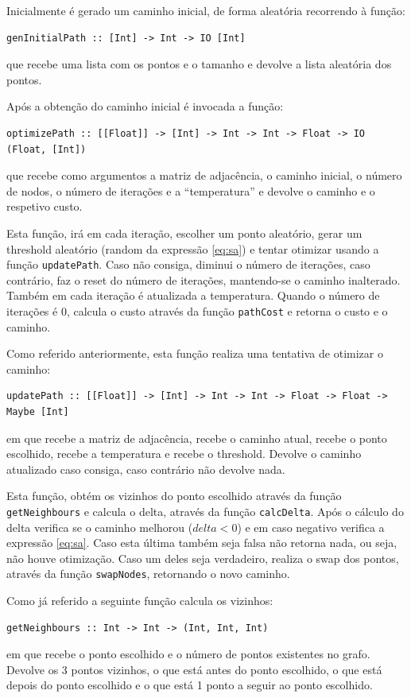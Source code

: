 \documentclass{article}
\begin{document}
Inicialmente é gerado um caminho inicial, de forma aleatória recorrendo à função:
\begin{verbatim}
genInitialPath :: [Int] -> Int -> IO [Int]
\end{verbatim}
que recebe uma lista com os pontos e o tamanho e devolve a lista aleatória dos pontos.

Após a obtenção do caminho inicial é invocada a função:
\begin{verbatim}
optimizePath :: [[Float]] -> [Int] -> Int -> Int -> Float -> IO (Float, [Int])
\end{verbatim}
que recebe como argumentos a matriz de adjacência, o caminho inicial, o número de nodos, o número de iterações e a ``temperatura'' e devolve o caminho e o respetivo custo. 

Esta função, irá em cada iteração, escolher um ponto aleatório, gerar um threshold aleatório (random da expressão \ref{eq:sa}) e tentar otimizar usando a função \texttt{updatePath}. Caso não consiga, diminui o número de iterações, caso contrário, faz o reset do número de iterações, mantendo-se o caminho inalterado. Também em cada iteração é atualizada a temperatura. Quando o número de iterações é 0, calcula o custo através da função \texttt{pathCost} e retorna o custo e o caminho.

Como referido anteriormente, esta função realiza uma tentativa de otimizar o caminho:
\begin{verbatim}
updatePath :: [[Float]] -> [Int] -> Int -> Int -> Float -> Float -> Maybe [Int]
\end{verbatim}
em que recebe a matriz de adjacência, recebe o caminho atual, recebe o ponto escolhido, recebe a temperatura e recebe o threshold. Devolve o caminho atualizado caso consiga, caso contrário não devolve nada. 

Esta função, obtém os vizinhos do ponto escolhido através da função \texttt{getNeighbours} e calcula o delta, através da função \texttt{calcDelta}. Após o cálculo do delta verifica se o caminho melhorou ($delta < 0$) e em caso negativo verifica a expressão \ref{eq:sa}. Caso esta última também seja falsa não retorna nada, ou seja, não houve otimização. Caso um deles seja verdadeiro, realiza o swap dos pontos, através da função \texttt{swapNodes}, retornando o novo caminho.

Como já referido a seguinte função calcula os vizinhos:
\begin{verbatim}
getNeighbours :: Int -> Int -> (Int, Int, Int)
\end{verbatim}
em que recebe o ponto escolhido e o número de pontos existentes no grafo. Devolve os 3 pontos vizinhos, o que está antes do ponto escolhido, o que está depois do ponto escolhido e o que está 1 ponto a seguir ao ponto escolhido.
\end{document}
